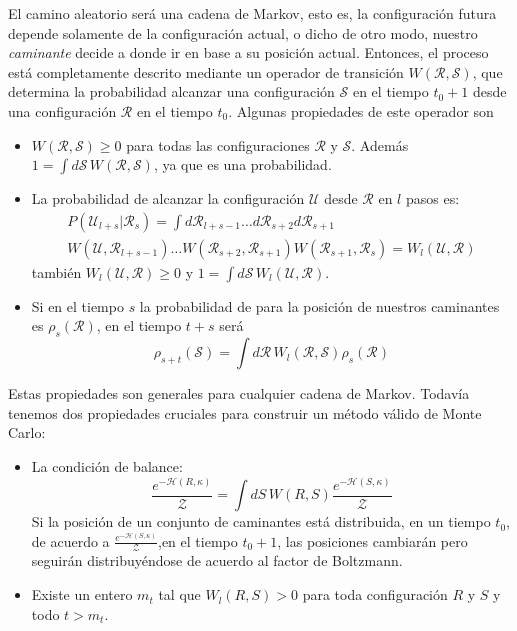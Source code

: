 El camino aleatorio será una cadena de Markov, esto es, la configuración futura
depende solamente de la configuración actual, o dicho de otro modo, nuestro
\textit{caminante} decide a donde ir en base a su posición actual. Entonces,
el proceso está completamente descrito mediante un operador 
de transición $W(\mathcal{R},\mathcal{S})$, que determina la probabilidad
alcanzar una configuración $\mathcal{S}$ en el tiempo $t_0+1$ desde una
configuración $\mathcal{R}$ en el tiempo $t_0$. Algunas propiedades de este
operador son 
\begin{itemize}
\item $W(\mathcal{R},\mathcal{S})\geq 0$ para todas las configuraciones
  $\mathcal{R}$ y $\mathcal{S}$. Además $1=\int
  d\mathcal{S}\,W(\mathcal{R},\mathcal{S}) $, ya que es una probabilidad.
\item La probabilidad de alcanzar la configuración $\mathcal{U}$ desde
  $\mathcal{R}$ en $l$ pasos es:
  \begin{multline}
    P(\mathcal{U}_{l+s}|\mathcal{R}_s)=\int
  d\mathcal{R}_{l+s-1}\dots d\mathcal{R}_{s+2}
  d\mathcal{R}_{s+1}\\W(\mathcal{U},\mathcal{R}_{l+s-1})\dots
  W(\mathcal{R}_{s+2},\mathcal{R}_{s+1}) W(\mathcal{R}_{s+1},\mathcal{R}_{s})=W_l(\mathcal{U},\mathcal{R})
  \end{multline}
  también $W_l(\mathcal{U},\mathcal{R}) \geq 0$ y $1=\int
  d\mathcal{S}\, W_l(\mathcal{U},\mathcal{R})$.
\item Si en el tiempo $s$ la probabilidad de para la posición de nuestros
  caminantes es $\rho_s(\mathcal{R})$, en el tiempo $t+s$ será
\begin{equation}
\rho_{s+t}(\mathcal{S})=\int
  d\mathcal{R}\, W_l(\mathcal{R},\mathcal{S})\rho_s(\mathcal{R})
\end{equation}
\end{itemize}
Estas propiedades son generales para cualquier cadena de Markov. Todavía
tenemos dos propiedades cruciales para construir un método válido de Monte
Carlo:
\begin{itemize}
\item La condición de balance:
  \begin{equation}
    \frac{e^{-\mathcal{H}(R,\kappa)}}{\mathcal{Z}}=\int
    dS\, W(R,S)\frac{e^{-\mathcal{H}(S,\kappa)}}{\mathcal{Z}}
  \end{equation}
  Si la posición de un conjunto de caminantes está distribuida, en un tiempo
  $t_0$, de acuerdo a $\frac{e^{-\mathcal{H}(S,\kappa)}}{\mathcal{Z}}$,en el
  tiempo $t_0+1$, las posiciones cambiarán pero seguirán distribuyéndose de
  acuerdo al factor de Boltzmann.
\item Existe un entero $m_t$ tal que $W_l(R,S)>0$ para toda configuración $R$ y
  $S$ y todo $t>m_t$. 
\end{itemize}

